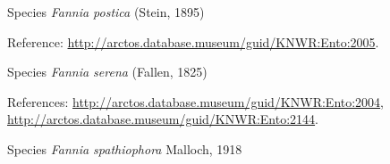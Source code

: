 \documentclass[9pt, article]{memoir}
\begin{document}
\begin{multicols}{2}
\vspace{6pt}\noindent\hspace{36pt}Species \textit{Fannia postica} (Stein, 1895)


Reference: 
\url{http://arctos.database.museum/guid/KNWR:Ento:2005}.

\vspace{6pt}\noindent\hspace{36pt}Species \textit{Fannia serena} (Fallen, 1825)


References: 
\url{http://arctos.database.museum/guid/KNWR:Ento:2004}, 
\url{http://arctos.database.museum/guid/KNWR:Ento:2144}.

\vspace{6pt}\noindent\hspace{36pt}Species \textit{Fannia spathiophora} Malloch, 1918



\end{multicols}
\end{document}
